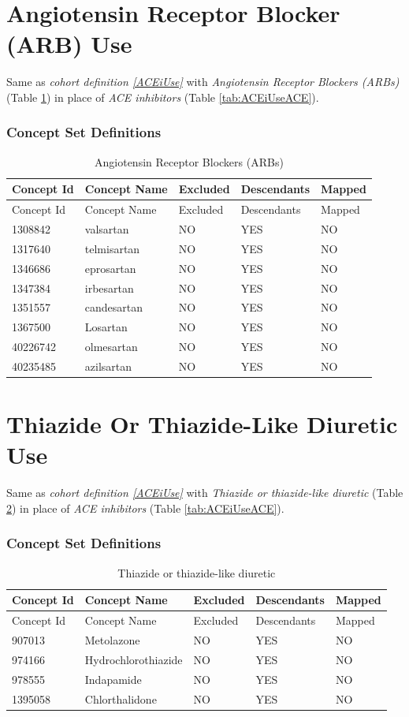 \documentclass[10.5pt]{book}
\theoremstyle{definition}
\theoremstyle{definition}
\theoremstyle{definition}
\theoremstyle{remark}
\begin{document}
\section{Angiotensin Receptor Blocker (ARB) Use}\label{ARBUse}

Same as \emph{cohort definition \ref{ACEiUse}} with \emph{Angiotensin
Receptor Blockers (ARBs)} (Table \ref{tab:ARBUseARBs}) in place of
\emph{ACE inhibitors} (Table \ref{tab:ACEiUseACE}).

\subsubsection*{Concept Set
Definitions}\label{concept-set-definitions-7}

\begin{longtable}[]{@{}lllll@{}}
\caption{\label{tab:ARBUseARBs} Angiotensin Receptor Blockers
(ARBs)}\tabularnewline
\toprule
Concept Id & Concept Name & Excluded & Descendants &
Mapped\tabularnewline
\midrule
\endfirsthead
\toprule
Concept Id & Concept Name & Excluded & Descendants &
Mapped\tabularnewline
\midrule
\endhead
1308842 & valsartan & NO & YES & NO\tabularnewline
1317640 & telmisartan & NO & YES & NO\tabularnewline
1346686 & eprosartan & NO & YES & NO\tabularnewline
1347384 & irbesartan & NO & YES & NO\tabularnewline
1351557 & candesartan & NO & YES & NO\tabularnewline
1367500 & Losartan & NO & YES & NO\tabularnewline
40226742 & olmesartan & NO & YES & NO\tabularnewline
40235485 & azilsartan & NO & YES & NO\tabularnewline
\bottomrule
\end{longtable}

\section{Thiazide Or Thiazide-Like Diuretic Use}\label{THZUse}

Same as \emph{cohort definition \ref{ACEiUse}} with \emph{Thiazide or
thiazide-like diuretic} (Table \ref{tab:THZUseTHZ}) in place of
\emph{ACE inhibitors} (Table \ref{tab:ACEiUseACE}).

\subsubsection*{Concept Set
Definitions}\label{concept-set-definitions-8}

\begin{longtable}[]{@{}lllll@{}}
\caption{\label{tab:THZUseTHZ} Thiazide or thiazide-like
diuretic}\tabularnewline
\toprule
Concept Id & Concept Name & Excluded & Descendants &
Mapped\tabularnewline
\midrule
\endfirsthead
\toprule
Concept Id & Concept Name & Excluded & Descendants &
Mapped\tabularnewline
\midrule
\endhead
907013 & Metolazone & NO & YES & NO\tabularnewline
974166 & Hydrochlorothiazide & NO & YES & NO\tabularnewline
978555 & Indapamide & NO & YES & NO\tabularnewline
1395058 & Chlorthalidone & NO & YES & NO\tabularnewline
\bottomrule
\end{longtable}
\end{document}
